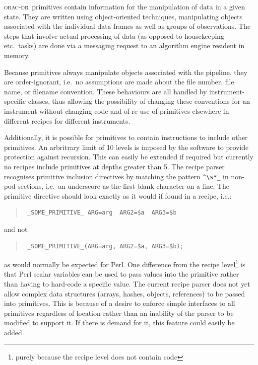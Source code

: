 \documentclass[twoside,11pt]{article}
\renewcommand{\_}{\texttt{\symbol{95}}}
\newcommand{\Oracdr}{\textsc{orac-dr}}
\newenvironment{myquote}{\begin{quote}\begin{small}}{\end{small}\end{quote}}
\begin{document}
\Oracdr\ primitives contain information for the manipulation of data in a
given state. They are written using object-oriented techniques,
manipulating objects associated with the individual data frames as
well as groups of observations. The steps that involve actual
processing of data (as opposed to housekeeping etc.\ tasks) are done via
a messaging request to an algorithm engine resident in memory.

Because primitives always manipulate objects associated with the
pipeline, they are order-ignorant, i.e.\ no assumptions are made about
the file number, file name, or filename convention. These behaviours
are all handled by instrument-specific classes, thus allowing the
possibility of changing these conventions for an instrument without
changing code and of re-use of primitives elsewhere in different
recipes for different instruments.

Additionally, it is possible for primitives to contain instructions to
include other primitives. An arbritrary limit of 10 levels is imposed
by the software to provide protection against recursion. This can
easily be extended if required but currently no recipes include
primitives at depths greater than 5.  The recipe parser recognises
primitive inclusion directives by matching the pattern \verb|^\s*_| in
non-pod sections, i.e.\ an underscore as the first blank character on a
line. The primitive directive should look exactly as it would if found
in a recipe, i.e.:
\begin{myquote}
\begin{verbatim}
 _SOME_PRIMITIVE_ ARG=arg  ARG2=$a  ARG3=$b
\end{verbatim}
\end{myquote}
and not
\begin{myquote}
\begin{verbatim}
 _SOME_PRIMITIVE_(ARG=arg, ARG2=$a, ARG3=$b);
\end{verbatim}
\end{myquote}
as would normally be expected for Perl. One difference from the recipe 
level\footnote{purely because the recipe level does not contain code} is that
Perl scalar variables can be used to pass values into the primitive
rather than having to hard-code a specific value. The current recipe
parser does not yet allow complex data structures (arrays, hashes,
objects, references) to be passed into primitives. This is because
of a desire to enforce simple interfaces to all primitives regardless
of location rather than an inability of the parser to be modified to
support it. If there is demand for it, this feature could easily be added.
\end{document}
